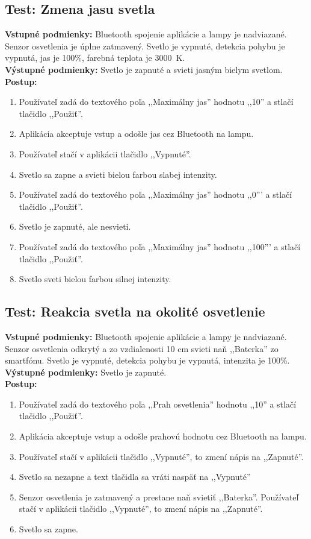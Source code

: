 \documentclass[12pt, a4paper]{article}
\begin{document}
\subsection{Test: Zmena jasu svetla}
\noindent\textbf{Vstupné podmienky:} Bluetooth spojenie aplikácie a lampy je nadviazané. Senzor osvetlenia je úplne zatmavený. Svetlo je vypnuté, detekcia pohybu je vypnutá, jas je 100\%, farebná teplota je 3000~K. \\
\textbf{Výstupné podmienky:} Svetlo je zapnuté a svieti jasným bielym svetlom. \\
\textbf{Postup:}
\begin{enumerate}
\itemsep0pt
\item Používateľ zadá do textového poľa ,,Maximálny jas'' hodnotu ,,10'' a stlačí tlačidlo ,,Použiť''.
\item Aplikácia akceptuje vstup a odošle jas cez Bluetooth na lampu.
\item Používateľ stačí v aplikácii tlačidlo ,,Vypnuté''.
\item Svetlo sa zapne a svieti bielou farbou slabej intenzity.
\item Používateľ zadá do textového poľa ,,Maximálny jas'' hodnotu ,,0''' a stlačí tlačidlo ,,Použiť''.
\item Svetlo je zapnuté, ale nesvieti.
\item Používateľ zadá do textového poľa ,,Maximálny jas'' hodnotu ,,100''' a stlačí tlačidlo ,,Použiť''.
\item Svetlo sveti bielou farbou silnej intenzity.
\end{enumerate}

\subsection{Test: Reakcia svetla na okolité osvetlenie}
\noindent\textbf{Vstupné podmienky:} Bluetooth spojenie aplikácie a lampy je nadviazané. Senzor osvetlenia odkrytý a zo vzdialenosti 10 cm svieti naň ,,Baterka'' zo smartfónu. Svetlo je vypnuté, detekcia pohybu je vypnutá, intenzita je 100\%.
\textbf{Výstupné podmienky:} Svetlo je zapnuté. \\
\textbf{Postup:}
\begin{enumerate}
\itemsep0pt
\item Používateľ zadá do textového poľa ,,Prah osvetlenia'' hodnotu ,,10'' a stlačí tlačidlo ,,Použiť''.
\item Aplikácia akceptuje vstup a odošle prahovú hodnotu cez Bluetooth na lampu.
\item Používateľ stačí v aplikácii tlačidlo ,,Vypnuté'', to zmení nápis na ,,Zapnuté''.
\item Svetlo sa nezapne a text tlačidla sa vráti naspäť na ,,Vypnuté''
\item Senzor osvetlenia je zatmavený a prestane naň svietiť ,,Baterka''. Používateľ stačí v aplikácii tlačidlo ,,Vypnuté'', to zmení nápis na ,,Zapnuté''.
\item Svetlo sa zapne.
\end{enumerate}
\end{document}
